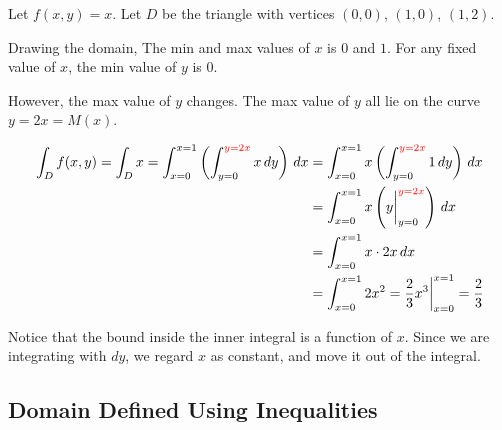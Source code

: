 \begin{example}
    Let $f(x, y) = x$. Let $D$ be the triangle with vertices $(0, 0)$, $(1, 0)$, $(1, 2)$.

    Drawing the domain, The min and max values of $x$ is $0$ and $1$. For any fixed value of $x$, the min value of $y$ is $0$.

    However, the max value of $y$ changes. The max value of $y$ all lie on the curve $y = 2x = M(x)$.
    
    \begin{center}
    \end{center}
    \begin{align*}
        \int_D f(x,y)   = \int_D x
                        = \int_{x=0}^{x=1} \left( \int_{y=0}^{{\color{red}y=2x}} x \,dy \right) \,dx
                      & = \int_{x=0}^{x=1} x \left( \int_{y=0}^{{\color{red}y=2x}} 1 \,dy \right) \,dx \\
                      & = \int_{x=0}^{x=1} x \left( y \bigg|_{y=0}^{{\color{red}y=2x}} \right) \,dx    \\
                      & = \int_{x=0}^{x=1} x \cdot 2x \,dx                                             \\
                      & = \int_{x=0}^{x=1} 2x^2
                        = \frac{2}{3} x^3 \bigg|_{x=0}^{x=1}
                        = \frac{2}{3}
    \end{align*}

    Notice that the bound inside the inner integral is a function of $x$. Since we are integrating with $dy$, we regard $x$ as constant, and move it out of the integral.
\end{example}

\subsection*{Domain Defined Using Inequalities}

